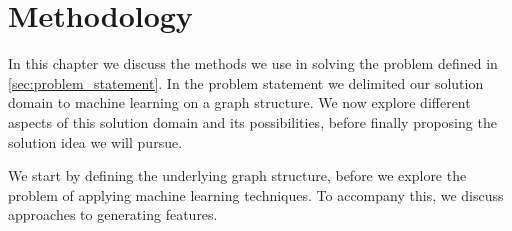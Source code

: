 \chapter{Methodology}\label{chap:analysis}

In this chapter we discuss the methods we use in solving the problem defined in \cref{sec:problem_statement}. In the problem statement we delimited our solution domain to machine learning on a graph structure. We now explore different aspects of this solution domain and its possibilities, before finally proposing the solution idea we will pursue.

We start by defining the underlying graph structure, before we explore the problem of applying machine learning techniques. To accompany this, we discuss approaches to generating features.








